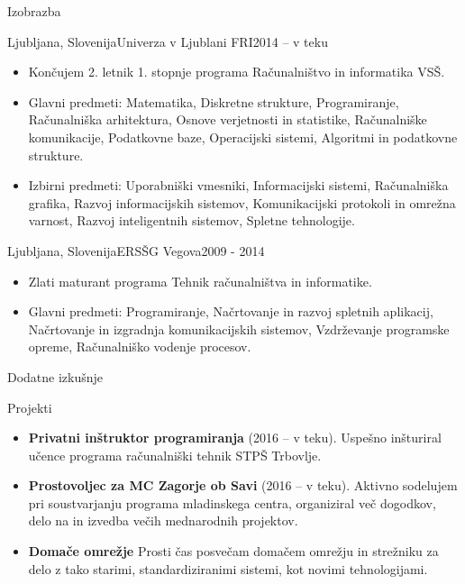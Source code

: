 \documentclass[]{mcdowellcv}
\begin{document}
	\begin{cvsection}{Izobrazba}
		\begin{cvsubsection}{Ljubljana, Slovenija}{Univerza v Ljublani FRI}{2014 -- v teku}
			\begin{itemize}
				\item Končujem 2. letnik 1. stopnje programa Računalništvo in informatika VSŠ.
				\item Glavni predmeti: Matematika, Diskretne strukture,  Programiranje, Računalniška arhitektura, Osnove verjetnosti in statistike, Računalniške komunikacije, Podatkovne baze, Operacijski sistemi, Algoritmi in podatkovne strukture.
				\item Izbirni predmeti: Uporabniški vmesniki, Informacijski sistemi, Računalniška grafika, Razvoj informacijskih sistemov, Komunikacijski protokoli in omrežna varnost, Razvoj inteligentnih sistemov, Spletne tehnologije.
			\end{itemize}
		\end{cvsubsection}
		\begin{cvsubsection}{Ljubljana, Slovenija}{ERSŠG Vegova}{2009 - 2014}
			\begin{itemize}
				\item Zlati maturant programa Tehnik računalništva in informatike.
				\item Glavni predmeti: Programiranje, Načrtovanje in razvoj spletnih aplikacij, Načrtovanje in izgradnja komunikacijskih sistemov, Vzdrževanje programske opreme, Računalniško vodenje procesov.
			\end{itemize}
		\end{cvsubsection}
	\end{cvsection}
	
	\begin{cvsection}{Dodatne izkušnje}
		\begin{cvsubsection}{Projekti}{}{}
			\begin{itemize}
				\item \textbf{Privatni inštruktor programiranja} (2016 -- v teku). Uspešno inšturiral učence programa računalniški tehnik STPŠ Trbovlje.
				\item \textbf{Prostovoljec za MC Zagorje ob Savi} (2016 -- v teku). Aktivno sodelujem pri soustvarjanju programa mladinskega centra, organiziral več dogodkov, delo na in izvedba večih mednarodnih projektov.
				\item \textbf{Domače omrežje} Prosti čas posvečam domačem omrežju in strežniku za delo z tako starimi, standardiziranimi sistemi, kot novimi tehnologijami.
			\end{itemize}
		\end{cvsubsection}
	\end{cvsection}	
\end{document}
